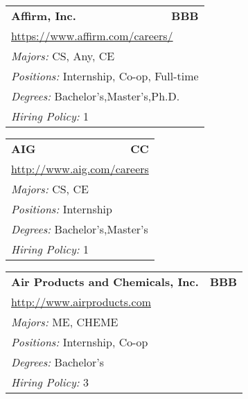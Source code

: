 \documentclass[twoside]{article}
\begin{document}
\begin{center}
\begin{multicols}{3}
\begin{FlushLeft}
\begin{minipage}{.9\columnwidth}
\end{minipage}
 
\begin{minipage}{.9\columnwidth}\begin{tabularx}{.95\columnwidth}{Xr}
                 {\Large\bf Affirm, Inc.} & {\Large\bf BBB}\\
    \multicolumn{2}{p{.95\columnwidth}}{\url{https://www.affirm.com/careers/}}\\
    \multicolumn{2}{p{.95\columnwidth}}{\emph{Majors:} CS, Any, CE}\\
    \multicolumn{2}{p{.95\columnwidth}}{\emph{Positions:} Internship, Co-op, Full-time}\\
    \multicolumn{2}{p{.95\columnwidth}}{\emph{Degrees:} Bachelor's,Master's,Ph.D.}\\
    \multicolumn{2}{p{.95\columnwidth}}{\emph{Hiring Policy:} 1}\\
    \end{tabularx}
    
\end{minipage}
 
\begin{minipage}{.9\columnwidth}\begin{tabularx}{.95\columnwidth}{Xr}
                 {\Large\bf AIG} & {\Large\bf CC}\\
    \multicolumn{2}{p{.95\columnwidth}}{\url{http://www.aig.com/careers}}\\
    \multicolumn{2}{p{.95\columnwidth}}{\emph{Majors:} CS, CE}\\
    \multicolumn{2}{p{.95\columnwidth}}{\emph{Positions:} Internship}\\
    \multicolumn{2}{p{.95\columnwidth}}{\emph{Degrees:} Bachelor's,Master's}\\
    \multicolumn{2}{p{.95\columnwidth}}{\emph{Hiring Policy:} 1}\\
    \end{tabularx}
    
\end{minipage}
 
\begin{minipage}{.9\columnwidth}\begin{tabularx}{.95\columnwidth}{Xr}
                 {\Large\bf Air Products and Chemicals, Inc.} & {\Large\bf BBB}\\
    \multicolumn{2}{p{.95\columnwidth}}{\url{http://www.airproducts.com}}\\
    \multicolumn{2}{p{.95\columnwidth}}{\emph{Majors:} ME, CHEME}\\
    \multicolumn{2}{p{.95\columnwidth}}{\emph{Positions:} Internship, Co-op}\\
    \multicolumn{2}{p{.95\columnwidth}}{\emph{Degrees:} Bachelor's}\\
    \multicolumn{2}{p{.95\columnwidth}}{\emph{Hiring Policy:} 3}\\
    \end{tabularx}
    

\end{minipage}
\end{FlushLeft}
\end{multicols}
\end{center}
\end{document}
